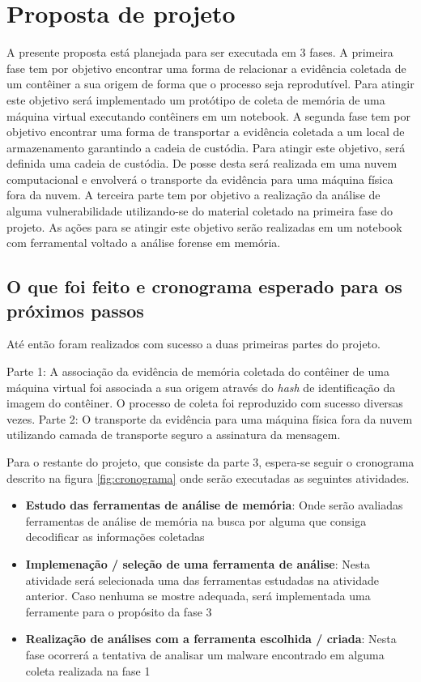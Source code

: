 \chapter{Proposta de projeto}
\label{chp:proposta}

A presente proposta está planejada para ser executada em 3 fases.
%
A primeira fase tem por objetivo encontrar uma forma de relacionar a evidência coletada de um contêiner a sua origem de forma que o processo seja reprodutível. 
%
Para atingir este objetivo será implementado um protótipo de coleta de memória de uma máquina virtual executando contêiners em um notebook.
%
A segunda fase tem por objetivo encontrar uma forma de transportar a evidência coletada a um local de armazenamento garantindo a cadeia de custódia.
%
Para atingir este objetivo, será definida uma cadeia de custódia. De posse desta será realizada em uma nuvem computacional e envolverá o transporte da evidência para uma máquina física fora da nuvem.
%
A terceira parte tem por objetivo a realização da análise de alguma vulnerabilidade utilizando-se do material coletado na primeira fase do projeto.
%
As ações para se atingir este objetivo serão realizadas em um notebook com ferramental voltado a análise forense em memória.

\section{O que foi feito e cronograma esperado para os próximos passos}
\label{sec:até_agora}

Até então foram realizados com sucesso a duas primeiras partes do projeto.

%
Parte 1: A associação da evidência de memória coletada do contêiner de uma máquina virtual foi associada a sua origem através do \textit{hash} de identificação da imagem do contêiner. O processo de coleta foi reproduzido com sucesso diversas vezes.
%
Parte 2: O transporte da evidência para uma máquina física fora da nuvem utilizando camada de transporte seguro a assinatura da mensagem.
%

Para o restante do projeto, que consiste da parte 3, espera-se seguir o cronograma descrito na figura \ref{fig:cronograma} onde serão executadas as seguintes atividades.

\begin{itemize}
 \item \textbf{Estudo das ferramentas de análise de memória}: Onde serão avaliadas ferramentas de análise de memória na busca por alguma que consiga decodificar as informações coletadas 
 \item \textbf{Implemenação / seleção de uma ferramenta de análise}: Nesta atividade será selecionada uma das ferramentas estudadas na atividade anterior. Caso nenhuma se mostre adequada, será implementada uma ferramente para o propósito da fase 3
 \item \textbf{Realização de análises com a ferramenta escolhida / criada}: Nesta fase ocorrerá a tentativa de analisar um malware encontrado em alguma coleta realizada na fase 1
\end{itemize}

